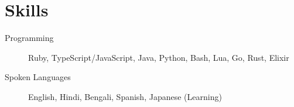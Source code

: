 \documentclass[11pt]{article} %
\begin{document}
\section{Skills}
\begin{description}
  \item[Programming] Ruby, TypeScript/JavaScript, Java, Python, Bash, Lua, Go, Rust, Elixir
  \item[Spoken Languages] English, Hindi, Bengali, Spanish, Japanese (Learning)
\end{description}
\end{document}

